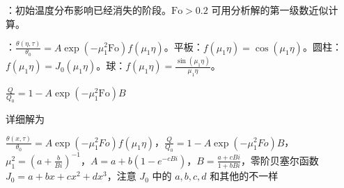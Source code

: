 ：初始温度分布影响已经消失的阶段。$\mathrm{Fo}>0.2$ 可用分析解的第一级数近似计算。

：$\frac{\theta(\eta,\tau)}{\theta_0}=A\exp(-\mu_1^2\mathrm{Fo})f(\mu_1\eta)$。平板：$f(\mu_1\eta)=\cos(\mu_1\eta)$。圆柱：$f(\mu_1\eta)=J_0(\mu_1\eta)$。球：$f(\mu_1\eta)=\frac{\sin(\mu_1\eta)}{\mu_1\eta}$。

 $\frac{Q}{Q_0}=1-A\exp(-\mu_1^2\mathrm{Fo})B$

详细解为

\par\vspace{0.5pt}
{\centering
    \renewcommand{\arraystretch}{2.2}
    \par}


$\frac{\theta(x,\tau)}{\theta_0}=A\exp\left(-\mu_1^2Fo\right)f\left(\mu_1\eta\right)$，$\frac{Q}{Q_0}=1-A\exp(-\mu_1^2Fo)B$，$\mu_1^2=(a+\frac{b}{Bi})^{-1}$，$A=a+b(1-e^{-cBi})$，$B=\frac{a+cBi}{1+bBi}$，零阶贝塞尔函数 $J_0=a+bx+cx^2+dx^3$，注意 $J_0$ 中的 $a,b,c,d$ 和其他的不一样

